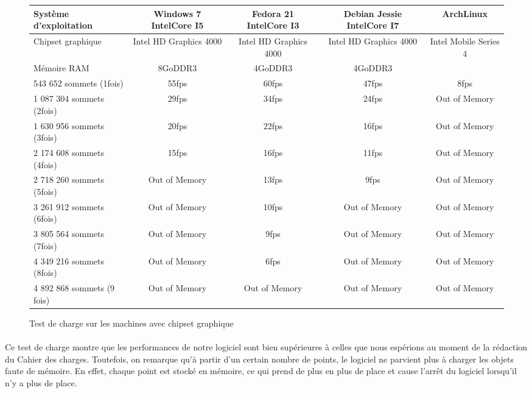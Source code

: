 \begin{figure}[h]
  \begin{changemargin}{-4cm}{-4cm}
    \centering
    \begin{tabular}{|l|c|c|c|c|}
      \hline
      Système d'exploitation & Windows 7 IntelCore I5 & Fedora 21 IntelCore I3 & Debian Jessie IntelCore I7 & ArchLinux\\ \hline
      Chipset graphique &  Intel HD Graphics 4000 & Intel HD Graphics 4000 & Intel HD Graphics 4000 & Intel Mobile Series 4 \\ \hline
      Mémoire RAM & 8GoDDR3 & 4GoDDR3 & 4GoDDR3 & \\ \hline \hline
      543 652 sommets (1fois) & 55fps & 60fps & 47fps & 8fps\\ \hline
      1 087 304 sommets (2fois) & 29fps & 34fps & 24fps & Out of Memory\\ \hline
      1 630 956 sommets (3fois) & 20fps & 22fps & 16fps & Out of Memory \\ \hline
      2 174 608 sommets (4fois) & 15fps & 16fps & 11fps & Out of Memory \\ \hline
      2 718 260 sommets (5fois) & Out of Memory & 13fps & 9fps & Out of Memory \\ \hline
      3 261 912 sommets (6fois) & Out of Memory & 10fps & Out of Memory & Out of Memory \\ \hline
      3 805 564 sommets (7fois) & Out of Memory & 9fps & Out of Memory & Out of Memory \\ \hline
      4 349 216 sommets (8fois) & Out of Memory & 6fps & Out of Memory & Out of Memory \\ \hline
      4 892 868 sommets (9 fois) & Out of Memory & Out of Memory & Out of Memory & Out of Memory \\ \hline
    \end{tabular}
  \end{changemargin}
  \caption{Test de charge sur les machines avec chipset graphique}
  \label{tab:charge_chip}
\end{figure}

\paragraph{}
Ce test de charge montre que les performances de notre logiciel sont bien supérieures à celles que nous espérions au moment de la rédaction du Cahier des charges. Toutefois, on remarque qu'à partir d'un certain nombre de points, le logiciel ne parvient plus à charger les objets faute de mémoire. En effet, chaque point est stocké en mémoire, ce qui prend de plus en plus de place et cause l'arrêt du logiciel lorsqu'il n'y a plus de place. 

